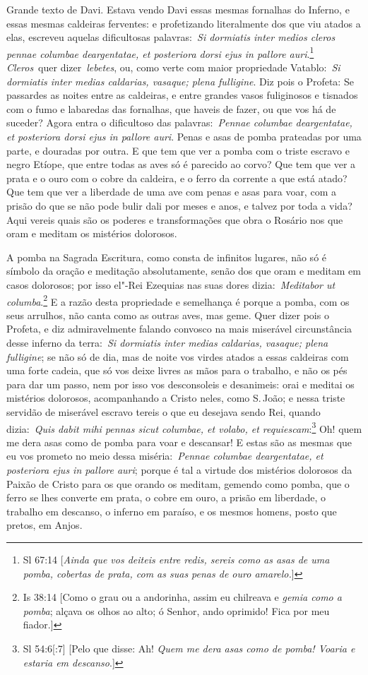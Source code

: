 Grande texto de Davi. Estava vendo Davi essas mesmas
fornalhas do Inferno, e essas mesmas caldeiras ferventes: e profetizando
literalmente dos que viu atados a elas, escreveu aquelas dificultosas
palavras:~\emph{Si dormiatis inter medios cleros pennae columbae
deargentatae, et posteriora dorsi ejus in pallore
auri}.\footnote{Sl 67:14 [\textit{Ainda que vos deiteis entre redis, sereis como as asas de uma pomba, cobertas de prata, com as suas penas de ouro amarelo.}]} \emph{Cleros}~quer dizer~\emph{lebetes}, ou,
como verte com maior propriedade Vatablo:~\emph{Si dormiatis inter
medias caldarias, vasaque; plena fulligine}. Diz pois o Profeta: Se
passardes as noites entre as caldeiras, e entre grandes vasos
fuliginosos e tisnados com o fumo e labaredas das fornalhas, que haveis
de fazer, ou que vos há de suceder? Agora entra o dificultoso das
palavras:~\emph{Pennae columbae deargentatae, et posteriora dorsi ejus
in pallore auri}. Penas e asas de pomba prateadas por uma parte, e
douradas por outra. E que tem que ver a pomba com o triste escravo e
negro Etíope, que entre todas as aves só é parecido ao corvo? Que tem
que ver a prata e o ouro com o cobre da caldeira, e o ferro da corrente
a que está atado? Que tem que ver a liberdade de uma ave com penas e
asas para voar, com a prisão do que se não pode bulir dali por meses e
anos, e talvez por toda a vida? Aqui vereis quais são os poderes e
transformações que obra o Rosário nos que oram e meditam os mistérios
dolorosos.

A pomba na Sagrada Escritura, como consta de infinitos
lugares, não só é símbolo da oração e meditação absolutamente, senão dos
que oram e meditam em casos dolorosos; por isso el"-Rei Ezequias nas suas
dores dizia:~\emph{Meditabor ut columba}.\footnote{Is 38:14 [Como o grau ou a andorinha, assim eu chilreava e \textit{gemia como a pomba}; alçava os olhos
ao alto; ó Senhor, ando oprimido! Fica por meu fiador.]} E a razão
desta propriedade e semelhança é porque a pomba, com os seus arrulhos,
não canta como as outras aves, mas geme. Quer dizer pois o Profeta, e
diz admiravelmente falando convosco na mais miserável circunstância
desse inferno da terra:~\emph{Si dormiatis inter medias caldarias,
vasaque; plena fulligine}; se não só de dia, mas de noite vos virdes
atados a essas caldeiras com uma forte cadeia, que só vos deixe livres
as mãos para o trabalho, e não os pés para dar um passo, nem por isso
vos desconsoleis e desanimeis: orai e meditai os mistérios dolorosos,
acompanhando a Cristo neles, como S.\,João; e nessa triste servidão de
miserável escravo tereis o que eu desejava sendo Rei, quando
dizia:~\emph{Quis dabit mihi pennas sicut columbae, et volabo, et
requiescam}:\footnote{Sl 54:6[:7] [Pelo que disse: Ah! \textit{Quem me dera asas como de pomba! Voaria e estaria em descanso}.]} Oh! quem me dera asas como de pomba para
voar e descansar! E estas são as mesmas que eu vos prometo no meio dessa
miséria:~\emph{Pennae columbae deargentatae, et posteriora ejus in
pallore auri}; porque é tal a virtude dos mistérios dolorosos da Paixão
de Cristo para os que orando os meditam, gemendo como pomba, que o ferro
se lhes converte em prata, o cobre em ouro, a prisão em liberdade, o
trabalho em descanso, o inferno em paraíso, e os mesmos homens, posto
que pretos, em Anjos.


